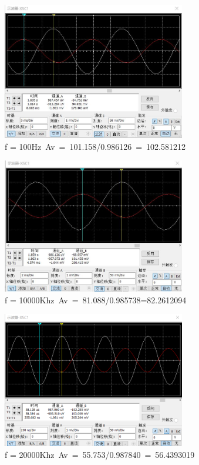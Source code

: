 \documentclass[10pt, conference, compsocconf, a4paper]{IEEEtran}
\begin{document}
\begin{figure}[h]
  \includegraphics[width=8cm]{img/g.png}
  \caption{f = 100Hz Av = 101.158/0.986126 = 102.581212}
\end{figure}

\begin{figure}[h]
  \includegraphics[width=8cm]{img/h.png}
  \caption{f = 10000Khz Av = 81.088/0.985738=82.2612094}
\end{figure}

\begin{figure}[h]
  \includegraphics[width=8cm]{img/i.png}
  \caption{f = 20000Khz Av = 55.753/0.987840 = 56.4393019}
\end{figure}
\end{document}
